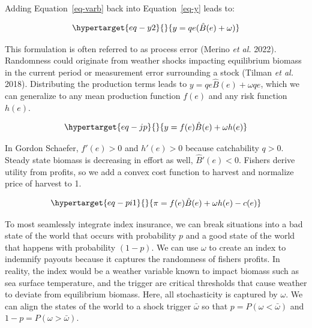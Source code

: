 \documentclass[
  letterpaper,
  DIV=11,
  numbers=noendperiod]{scrartcl}
\theoremstyle{plain}
\theoremstyle{plain}
\theoremstyle{remark}
\begin{document}
Adding Equation~\ref{eq-varb} back into Equation~\ref{eq-y} leads to:

\begin{equation}\protect\hypertarget{eq-y2}{}{
\begin{aligned}
y=qe(\hat{B}(e)+\omega)
\end{aligned}
}\label{eq-y2}\end{equation}

This formulation is often referred to as process error (Merino \emph{et
al.} 2022). Randomness could originate from weather shocks impacting
equilibrium biomass in the current period or measurement error
surrounding a stock (Tilman \emph{et al.} 2018). Distributing the
production terms leads to \(y=qe\hat{B}(e)+\omega qe\), which we can
generalize to any mean production function \(f(e)\) and any risk
function \(h(e)\).

\begin{equation}\protect\hypertarget{eq-jp}{}{
\begin{aligned}
y=f(e)\hat{B}(e)+\omega h(e)
\end{aligned}
}\label{eq-jp}\end{equation}

In Gordon Schaefer, \(f'(e)>0\) and \(h'(e)>0\) because catchability
\(q>0\). Steady state biomass is decreasing in effort as well,
\(\hat{B}'(e)<0\). Fishers derive utility from profits, so we add a
convex cost function to harvest and normalize price of harvest to 1.

\begin{equation}\protect\hypertarget{eq-pi1}{}{
\begin{aligned}
\pi=f(e)\hat{B}(e)+\omega h(e)-c(e)
\end{aligned}
}\label{eq-pi1}\end{equation}

To most seamlessly integrate index insurance, we can break situations
into a bad state of the world that occurs with probability \(p\) and a
good state of the world that happens with probability \((1-p)\). We can
use \(\omega\) to create an index to indemnify payouts because it
captures the randomness of fishers profits. In reality, the index would
be a weather variable known to impact biomass such as sea surface
temperature, and the trigger are critical thresholds that cause weather
to deviate from equilibrium biomass. Here, all stochasticity is captured
by \(\omega\). We can align the states of the world to a shock trigger
\(\bar\omega\) so that \(p=P(\omega<\bar\omega)\) and
\(1-p=P(\omega>\bar\omega)\).
\end{document}

